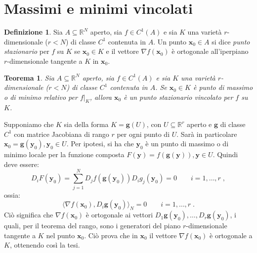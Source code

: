 \documentclass[a4paper,12pt]{report}
\theoremstyle{plain}
\newtheorem{thm}{Teorema}[section]
\theoremstyle{definition}
\newtheorem{defn}{Definizione}[section]
\theoremstyle{remark}
\numberwithin{equation}{section}
\begin{document}
\section{Massimi e minimi vincolati}
\begin{defn} Sia $A \subseteq \mathbb{R}^N$ aperto, sia $f \in C^1(A)$ e sia $K$ una varietà $r$-dimensionale ($r<N$) di classe $C^1$ contenuta in $A$. Un punto $\mathbf{x}_0 \in A$ si dice \textit{punto stazionario} per $f$ su $K$ se $\mathbf{x}_0 \in K$ e il vettore $\nabla f(\mathbf{x}_0)$ è ortogonale all'iperpiano $r$-dimensionale tangente a $K$ in $\mathbf{x}_0$.
\end{defn}
\begin{thm} Sia $A\subseteq \mathbb{R}^N$ aperto, sia $f \in C^1(A)$ e sia $K$ una varietà $r$-dimensionale ($r<N$) di classe $C^1$ contenuta in $A$. Se $\mathbf{x}_0 \in K$ è punto di massimo o di minimo relativo per $f|_K$, allora $\mathbf{x}_0$ è un punto stazionario vincolato per $f$ su $K$.
\end{thm}
\proof Supponiamo che $K$ sia della forma $K=\mathbf{g}(U)$, con $U \subseteq \mathbb{R}^r$ aperto e $\mathbf{g}$ di classe $C^1$ con matrice Jacobiana di rango $r$ per ogni punto di $U$. Sarà in particolare $\mathbf{x}_0=\mathbf{g}(\mathbf{y}_0), \mathbf{y}_0\in U$. Per ipotesi, si ha che $\mathbf{y}_0$ è un punto di massimo o di minimo locale per la funzione composta $F(\mathbf{y})=f(\mathbf{g}(\mathbf{y})), \mathbf{y} \in U$. Quindi deve essere:
\begin{equation}
D_iF(\mathbf{y}_0)=\sum_{j=1}^N D_jf(\mathbf{g}(\mathbf{y}_0))D_ig_j(\mathbf{y}_0)=0 \qquad i=1,\ldots,r\;,
\end{equation}
ossia:
\begin{equation}
\langle \nabla f(\mathbf{x}_0),D_i\mathbf{g}(\mathbf{y}_0)\rangle_N = 0 \qquad i=1,\ldots,r\;.
\end{equation}
Ciò significa che $\nabla f(\mathbf{x}_0)$ è ortogonale ai vettori $D_1\mathbf{g}(\mathbf{y}_0),\ldots,D_r\mathbf{g}(\mathbf{y}_0)$, i 
quali, per il teorema del rango, sono i generatori del piano $r$-dimensionale tangente a $K$ nel punto $\mathbf{x}_0$. Ciò prova che in 
$\mathbf{x}_0$ il vettore $\nabla f(\mathbf{x}_0)$ è ortogonale a $K$, ottenendo così la tesi.
\endproof
\end{document}
